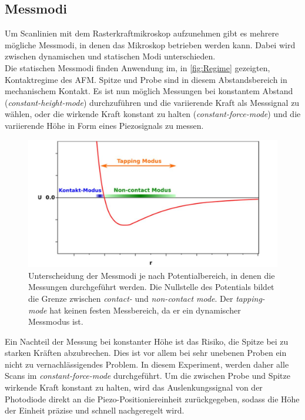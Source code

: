 \subsection{Messmodi}
\label{subsec:messmodi}
Um Scanlinien mit dem Rasterkraftmikroskop aufzunehmen gibt es mehrere mögliche Messmodi, in denen das Mikroskop betrieben werden kann. Dabei wird zwischen dynamischen und statischen Modi unterschieden.\\
Die statischen Messmodi finden Anwendung im, in \autoref{fig:Regime} gezeigten, Kontaktregime des AFM. Spitze und Probe sind in diesem Abstandsbereich in mechanischem Kontakt. Es ist nun möglich Messungen bei konstantem Abstand (\textit{constant-height-mode}) durchzuführen und die variierende Kraft als Messsignal zu wählen, oder die wirkende Kraft konstant zu halten (\textit{constant-force-mode}) und die variierende Höhe in Form eines Piezosignals zu messen.\\
\begin{figure}[H]
  \centering
  \includegraphics[width=\textwidth]{content/plots/regime.jpg}
  \caption{Unterscheidung der Messmodi je nach Potentialbereich, in denen die Messungen durchgeführt werden. Die Nullstelle des Potentials bildet die Grenze zwischen \textit{contact-} und \textit{non-contact mode}. Der \textit{tapping-mode} hat keinen festen Messbereich, da er ein dynamischer Messmodus ist. }
  \label{fig:Regime}
\end{figure}
Ein Nachteil der Messung bei konstanter Höhe ist das Risiko, die Spitze bei zu starken Kräften abzubrechen. Dies ist vor allem bei sehr unebenen Proben ein nicht zu vernachlässigendes Problem.
In diesem Experiment, werden daher alle Scans im \textit{constant-force-mode} durchgeführt. Um die zwischen Probe und Spitze wirkende Kraft konstant zu halten, wird das Auslenkungssignal von der Photodiode direkt an die Piezo-Positioniereinheit zurückgegeben, sodass die Höhe der Einheit präzise und schnell nachgeregelt wird.\\

